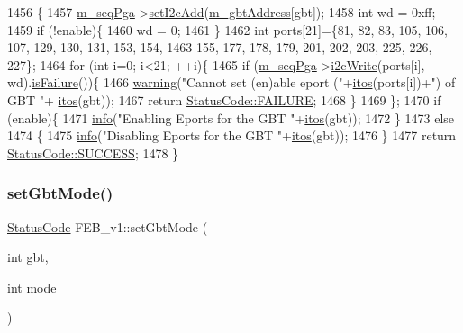 \begin{DoxyCode}
1456                                                         \{
1457   \hyperlink{classFEB__v1_a6c7804ac86796f233a8393043adf2e77}{m\_seqPga}->\hyperlink{classSeqPGA_a4ef334e4d2cb417b49033dce951728cd}{setI2cAdd}(\hyperlink{classFEB__v1_ac625855df976f16694178f1a4c0eef1e}{m\_gbtAddress}[gbt]);
1458   \textcolor{keywordtype}{int} wd = 0xff;
1459   \textcolor{keywordflow}{if} (!enable)\{
1460     wd = 0;
1461   \}
1462   \textcolor{keywordtype}{int} ports[21]=\{81, 82, 83, 105, 106, 107, 129, 130, 131, 153, 154,
1463          155, 177, 178, 179, 201, 202, 203, 225, 226, 227\};
1464   \textcolor{keywordflow}{for} (\textcolor{keywordtype}{int} i=0; i<21; ++i)\{
1465     \textcolor{keywordflow}{if} (\hyperlink{classFEB__v1_a6c7804ac86796f233a8393043adf2e77}{m\_seqPga}->\hyperlink{classSeqPGA_a429076ca3a4ece94182bd95c623bb9d0}{i2cWrite}(ports[i], wd).\hyperlink{classStatusCode_a5dd22dc6eb2c52fc4cabc58f6dea2eb7}{isFailure}())\{
1466       \hyperlink{classObject_a65cd4fda577711660821fd2cd5a3b4c9}{warning}(\textcolor{stringliteral}{"Cannot set (en)able eport ("}+\hyperlink{Tools_8h_af330027dbdafb9a30768b3613c553e60}{itos}(ports[i])+\textcolor{stringliteral}{") of GBT "}+
      \hyperlink{Tools_8h_af330027dbdafb9a30768b3613c553e60}{itos}(gbt));
1467       \textcolor{keywordflow}{return} \hyperlink{classStatusCode_a6f565cbeadc76d14c72f047e5e85eb4ba3da73d4c469762eb9d3c960368252b26}{StatusCode::FAILURE};
1468     \}
1469   \};
1470   \textcolor{keywordflow}{if} (enable)\{
1471     \hyperlink{classObject_a644fd329ea4cb85f54fa6846484b84a8}{info}(\textcolor{stringliteral}{"Enabling Eports for the GBT "}+\hyperlink{Tools_8h_af330027dbdafb9a30768b3613c553e60}{itos}(gbt));
1472   \}
1473   \textcolor{keywordflow}{else}
1474   \{
1475     \hyperlink{classObject_a644fd329ea4cb85f54fa6846484b84a8}{info}(\textcolor{stringliteral}{"Disabling Eports for the GBT "}+\hyperlink{Tools_8h_af330027dbdafb9a30768b3613c553e60}{itos}(gbt));
1476   \}
1477   \textcolor{keywordflow}{return} \hyperlink{classStatusCode_a6f565cbeadc76d14c72f047e5e85eb4badd0da38d3ba0d922efd1f4619bc37ad8}{StatusCode::SUCCESS};
1478 \}
\end{DoxyCode}
\mbox{\label{classFEB__v1_a849040ff2fa8275b1a47e7be3915ebf4}} 
\subsubsection{\texorpdfstring{set\+Gbt\+Mode()}{setGbtMode()}}
{\footnotesize\ttfamily \hyperlink{classStatusCode}{Status\+Code} F\+E\+B\+\_\+v1\+::set\+Gbt\+Mode (\begin{DoxyParamCaption}\item[{int}]{gbt,  }\item[{int}]{mode }\end{DoxyParamCaption})}



